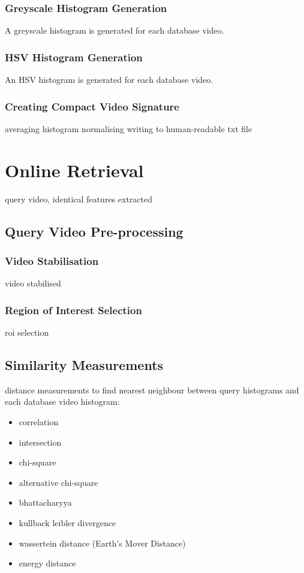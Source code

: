 \subsubsection{Greyscale Histogram Generation}

A greyscale histogram is generated for each database video. 

\subsubsection{HSV Histogram Generation}

An HSV histogram is generated for each database video. 

\subsubsection{Creating Compact Video Signature}

averaging histogram
normalising
writing to human-readable txt file

\section{Online Retrieval}

query video, identical features extracted

\subsection{Query Video Pre-processing}

\subsubsection{Video Stabilisation}

video stabilised

\subsubsection{Region of Interest Selection}

roi selection

\subsection{Similarity Measurements}

distance measurements to find nearest neighbour between query histograms and each database video histogram:

\begin{itemize}
    \item correlation
    \item intersection
    \item chi-square
    \item alternative chi-square
    \item bhattacharyya
    \item kullback leibler divergence
    \item wassertein distance (Earth's Mover Distance)
    \item energy distance
\end{itemize}

